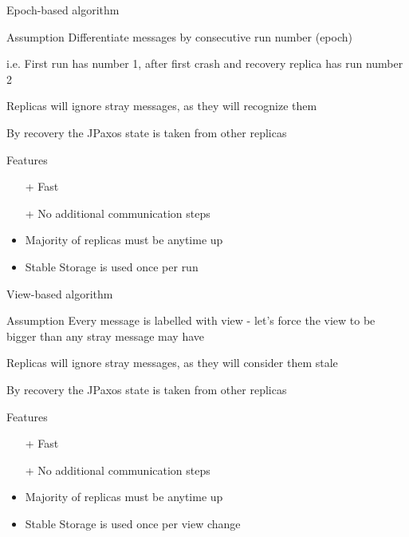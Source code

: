 \documentclass[hyperref={pdfpagelabels=true},11pt,compress,trans]{beamer}
\begin{document}
\begin{frame}{Epoch-based algorithm}
 \begin{block}{Assumption}
  Differentiate messages by consecutive run number (epoch)

{\footnotesize i.e. First run has number 1, after first crash and recovery replica has run number 2}

  Replicas will ignore stray messages, as they will recognize them

  By recovery the JPaxos state is taken from other replicas
 \end{block}
 \begin{block}{Features}
  \vspace{-1em}\vspace{-\parskip}\vspace{-\lineskip}
  \begin{itemize}
   \item[+]  Fast
   \item[+]  No additional communication steps
   \item     Majority of replicas must be anytime up
   \item     Stable Storage is used once per run
  \end{itemize}
 \end{block}
\end{frame}

\begin{frame}{View-based algorithm}
 \begin{block}{Assumption}
  Every message is labelled with view - let's force the view to be bigger than any stray message may have

  Replicas will ignore stray messages, as they will consider them stale

  By recovery the JPaxos state is taken from other replicas
 \end{block}
 \begin{block}{Features}
  \vspace{-1em}\vspace{-\parskip}\vspace{-\lineskip}
  \begin{itemize}
   \item[+]  Fast
   \item[+]  No additional communication steps
   \item     Majority of replicas must be anytime up
   \item     Stable Storage is used once per view change
  \end{itemize}
 \end{block}
\end{frame}
\end{document}

